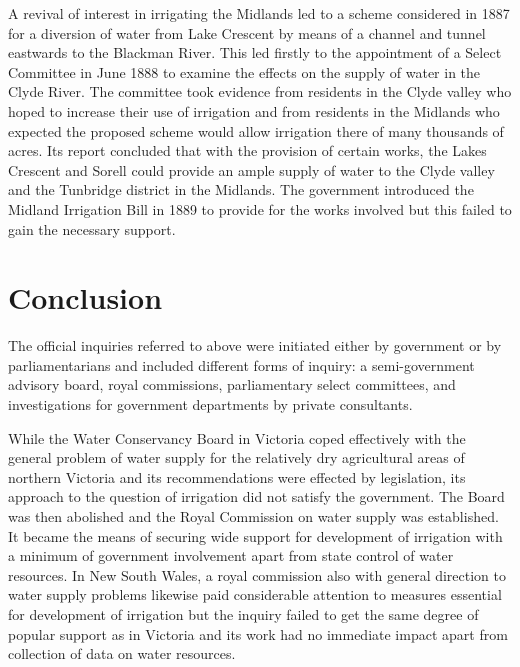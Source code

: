 A revival of interest in irrigating the Midlands led to a scheme
considered in 1887 for a diversion of water from Lake Crescent by
means of a channel and tunnel eastwards to the Blackman River.  This
led firstly to the appointment of a Select Committee in June 1888 to
examine the effects on the supply of water in the Clyde River.  The
committee took evidence from residents in the Clyde valley who hoped
to increase their use of irrigation and from residents in the Midlands
who expected the proposed scheme would allow irrigation there of many
thousands of acres.  Its report concluded that with the provision of
certain works, the Lakes Crescent and Sorell could provide an ample
supply of water to the Clyde valley and the Tunbridge district in the
Midlands.
The government introduced the Midland Irrigation Bill in 1889 to
provide for the works involved but this failed to gain the necessary
support.

\section*{Conclusion}

The official inquiries referred to above were initiated either by
government or by parliamentarians and included different forms of
inquiry: a semi-government advisory board, royal commissions,
parliamentary select committees, and investigations for government
departments by private consultants.

While the Water Conservancy Board in Victoria coped effectively with
the general problem of water supply for the relatively dry
agricultural areas of northern Victoria and its recommendations were
effected by legislation, its approach to the question of irrigation
did not satisfy the government.  The Board was then abolished and the
Royal Commission on water supply was established.  It became the
means of securing wide support for development of irrigation with a
minimum of government involvement apart from state control of water
resources.  In New South Wales, a royal commission also with general
direction to water supply problems likewise paid considerable
attention to measures essential for development of irrigation but the
inquiry failed to get the same degree of popular support as in
Victoria and its work had no immediate impact apart from collection of
data on water resources.

